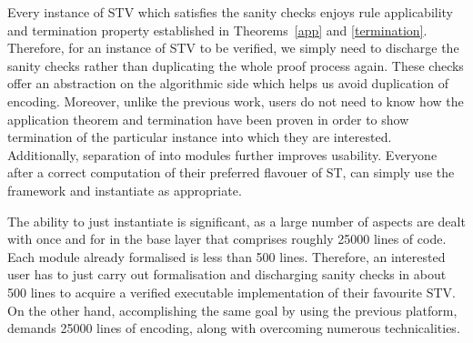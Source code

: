 \documentclass{llncs}
\begin{document}
Every instance of 
STV which satisfies the sanity checks enjoys rule applicability and
termination property established in Theorems~\ref{app} and
\ref{termination}. Therefore, for an instance of STV to be verified,
we simply need to discharge the sanity checks rather than
duplicating the whole proof process again. These checks
offer an abstraction on the algorithmic side which helps us avoid
duplication of encoding. Moreover, unlike the previous work, users
do not need to know how the application theorem and termination have
been proven in order to show termination of the particular instance
into which they are interested.  Additionally, separation of into
modules further improves usability.
Everyone after a correct computation of their preferred flavouer of  ST, can simply 
use the framework and instantiate as appropriate.

The ability to just instantiate is significant, as a large number of
aspects are dealt with 
once and for in the base layer that comprises roughly 25000 lines of
code. Each module already formalised is less than 500 lines.
Therefore, an interested user has to just carry out formalisation
and discharging sanity checks in about 500 lines to acquire a
verified executable implementation of their favourite STV. On the
other hand, accomplishing the same goal by using the previous
platform, demands  25000 lines of encoding, along with overcoming
numerous technicalities.   
\end{document}

